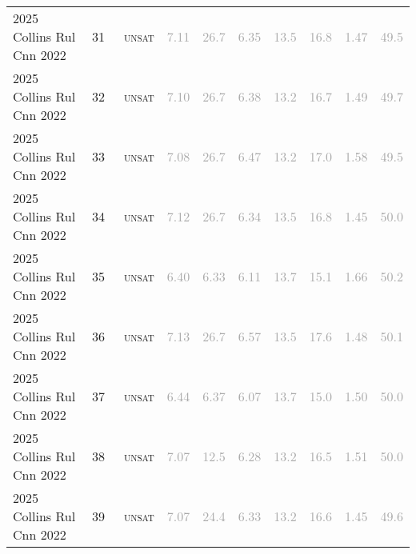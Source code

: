 \begin{center}
{\begin{longtable}{@{}llllllllll@{}}
2025 Collins Rul Cnn 2022 & 31 & ~\textsc{unsat} & \textcolor{darkgray}{7.11} & \textcolor{darkgray}{26.7} & \textcolor{darkgray}{6.35} & \textcolor{darkgray}{13.5} & \textcolor{darkgray}{16.8} & \textcolor{darkgray}{1.47} & \textcolor{darkgray}{49.5} \\
2025 Collins Rul Cnn 2022 & 32 & ~\textsc{unsat} & \textcolor{darkgray}{7.10} & \textcolor{darkgray}{26.7} & \textcolor{darkgray}{6.38} & \textcolor{darkgray}{13.2} & \textcolor{darkgray}{16.7} & \textcolor{darkgray}{1.49} & \textcolor{darkgray}{49.7} \\
2025 Collins Rul Cnn 2022 & 33 & ~\textsc{unsat} & \textcolor{darkgray}{7.08} & \textcolor{darkgray}{26.7} & \textcolor{darkgray}{6.47} & \textcolor{darkgray}{13.2} & \textcolor{darkgray}{17.0} & \textcolor{darkgray}{1.58} & \textcolor{darkgray}{49.5} \\
2025 Collins Rul Cnn 2022 & 34 & ~\textsc{unsat} & \textcolor{darkgray}{7.12} & \textcolor{darkgray}{26.7} & \textcolor{darkgray}{6.34} & \textcolor{darkgray}{13.5} & \textcolor{darkgray}{16.8} & \textcolor{darkgray}{1.45} & \textcolor{darkgray}{50.0} \\
2025 Collins Rul Cnn 2022 & 35 & ~\textsc{unsat} & \textcolor{darkgray}{6.40} & \textcolor{darkgray}{6.33} & \textcolor{darkgray}{6.11} & \textcolor{darkgray}{13.7} & \textcolor{darkgray}{15.1} & \textcolor{darkgray}{1.66} & \textcolor{darkgray}{50.2} \\
2025 Collins Rul Cnn 2022 & 36 & ~\textsc{unsat} & \textcolor{darkgray}{7.13} & \textcolor{darkgray}{26.7} & \textcolor{darkgray}{6.57} & \textcolor{darkgray}{13.5} & \textcolor{darkgray}{17.6} & \textcolor{darkgray}{1.48} & \textcolor{darkgray}{50.1} \\
2025 Collins Rul Cnn 2022 & 37 & ~\textsc{unsat} & \textcolor{darkgray}{6.44} & \textcolor{darkgray}{6.37} & \textcolor{darkgray}{6.07} & \textcolor{darkgray}{13.7} & \textcolor{darkgray}{15.0} & \textcolor{darkgray}{1.50} & \textcolor{darkgray}{50.0} \\
2025 Collins Rul Cnn 2022 & 38 & ~\textsc{unsat} & \textcolor{darkgray}{7.07} & \textcolor{darkgray}{12.5} & \textcolor{darkgray}{6.28} & \textcolor{darkgray}{13.2} & \textcolor{darkgray}{16.5} & \textcolor{darkgray}{1.51} & \textcolor{darkgray}{50.0} \\
2025 Collins Rul Cnn 2022 & 39 & ~\textsc{unsat} & \textcolor{darkgray}{7.07} & \textcolor{darkgray}{24.4} & \textcolor{darkgray}{6.33} & \textcolor{darkgray}{13.2} & \textcolor{darkgray}{16.6} & \textcolor{darkgray}{1.45} & \textcolor{darkgray}{49.6} \\

\end{longtable}}
\end{center}
